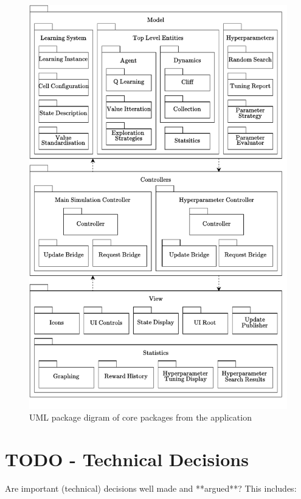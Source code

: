 \documentclass[]{final_report}
\begin{document}
\begin{figure}[H]
  \centering
  
  \includegraphics[width=\textwidth]{package_diagram-2.pdf}
  
  \caption{\label{fig:package-diagram} UML package digram of core packages from the application}
\end{figure}

\section{TODO - Technical Decisions}\label{section:technical-decsions}


Are important (technical) decisions well made and **argued**? This includes:
\end{document}
